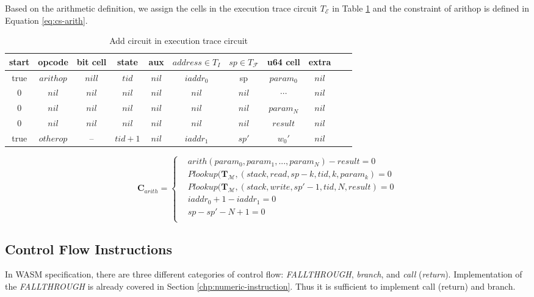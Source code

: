 Based on the arithmetic definition, we assign the cells in the execution trace circuit $T_\mathcal{E}$ in Table \ref{tbl:arith-instruction} and the constraint of arithop is defined in Equation \ref{eq:cs-arith}.
\begin{table}[!h]
\small
\begin{center}
\caption{Add circuit in execution trace circuit}
\label{tbl:arith-instruction}
\begin{tabular}{ | c | c | c | c | c | c | c | c | c | c | c | }
  \hline
  start & opcode & bit cell & state & aux & $address \in T_{I}$ & $sp \in T_\mathcal{F}$& u64 cell & extra \\ 
  \hline
   true & $arithop$ & $nill$ & $tid$ & $nil$ & $iaddr_0$ & sp & $param_0$ & $nil$\\ 
 \hline
   0 & $nil$ & $nil$ & $nil$ & $nil$ & $nil$ & $nil$ & $\cdots$ & $nil$\\ 
 \hline
   0 & $nil$ & $nil$ & $nil$ & $nil$ & $nil$ & $nil$ & $param_N$ & $nil$\\ 
 \hline
   0 & $nil$ & $nil$ & $nil$ & $nil$ & $nil$ & $nil$ & $result$ & $nil$\\ 
 \hline
    true & $otherop$ & -- & $tid+1$ & $nil$ & $iaddr_1$ & $sp'$ & $w_0'$ & $nil$\\
 \hline
\end{tabular}

\end{center}
\end{table}
\begin{equation}
    \mathbf{C}_{arith} = \begin{cases}
        &arith(param_0, param_1, ..., param_N) - result = 0 \\
        &Plookup(\mathbf{T}_\mathcal{M}, (stack, read, sp - k, tid, k, param_k) = 0 \\
        &Plookup(\mathbf{T}_\mathcal{M}, (stack, write, sp' - 1, tid, N, result) = 0 \\
        &iaddr_0 + 1 - iaddr_1 = 0\\
        &sp - sp' - N + 1 = 0\\
    \end{cases}
\label{eq:cs-arith}
\end{equation}
\subsection{Control Flow Instructions}
\label{chp:control-flow-ins}
In WASM specification, there are three different categories of control flow: \emph{FALLTHROUGH}, \emph{branch}, and \emph{call} (\emph{return}). Implementation of the \emph{FALLTHROUGH} is already covered in Section \ref{chp:numeric-instruction}. Thus it is sufficient to implement call (return) and branch.\\

